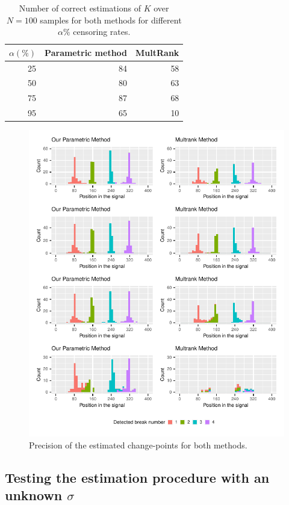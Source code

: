 \begin{table}[ht]
\centering
\begin{tabular}{|r|r|r|}
  \hline
   $\alpha(\%)$  & Parametric method & MultRank \\ 
  \hline
 25 &  84 &  58 \\ 
 50 &  80 &  63 \\ 
 75 &  87 &  68 \\ 
 95 &  65 &  10 \\ 
   \hline
\end{tabular}
\caption{Number of correct estimations of $K$ over $N=100$ samples for both methods for different $\alpha\%$ censoring rates.}
\label{tab:simcomp}
\end{table}

\begin{figure}[ht]
    \centering
    \includegraphics{figs/Chap4/detect_comp.pdf}
    \caption{Precision of the estimated change-points for both methods.}
    \label{fig:prec_sim}
\end{figure}


\subsection{Testing the estimation procedure with an unknown $\sigma$}

